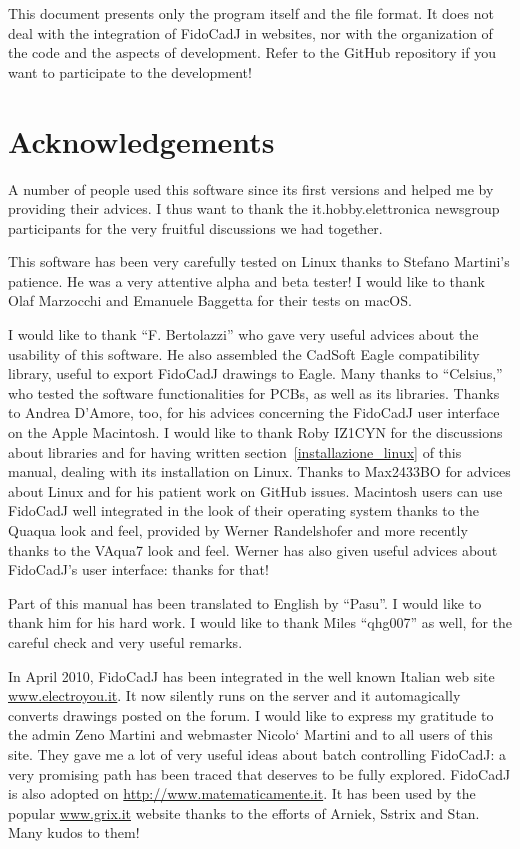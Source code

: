 \documentclass[10pt,a4paper,twoside]{scrreprt}
\begin{document}
This document presents only the program itself and the file format. It does not deal with the integration of FidoCadJ in websites, nor with the organization of the code and the aspects of development. Refer to the GitHub repository if you want to participate to the development!
\endgroup


\chapter*{Acknowledgements}

A number of people used this software since its first versions and
helped me by providing their advices. I thus want to thank the it.hobby.elettronica
newsgroup participants for the very fruitful discussions we had together.

This software has been very carefully tested on Linux thanks to
Stefano Martini's patience. He was a very attentive alpha and beta
tester! I would like to thank Olaf Marzocchi and Emanuele Baggetta
for their tests on macOS.

I would like to thank ``F. Bertolazzi'' who gave very useful
advices about the usability of this software. He also assembled the
CadSoft Eagle compatibility library, useful to export
FidoCadJ drawings to Eagle. Many thanks to ``Celsius,'' who tested
the software functionalities for PCBs, as well as its libraries.
Thanks to Andrea D'Amore, too, for his advices concerning the FidoCadJ user interface on the Apple Macintosh. I would like to thank
Roby IZ1CYN for the discussions about libraries and for having written
section~\ref{installazione_linux} of this manual, dealing with its installation on Linux. Thanks to Max2433BO for advices about Linux and for his patient work on GitHub issues.
Macintosh users can use FidoCadJ well integrated in the look of their operating system thanks to the Quaqua look and feel, provided by Werner Randelshofer and more recently thanks to the VAqua7 look and feel.
Werner has also given useful advices about FidoCadJ's user interface: thanks for that!

Part of this manual has been translated to English by ``Pasu''. I would like to thank him for his hard work. I would like to thank Miles ``qhg007'' as well, for the careful check and very useful remarks.

In April 2010, FidoCadJ has been integrated in the well known Italian web site \href{http://www.electroyou.it}{www.electroyou.it}. It now silently runs on the server and it automagically converts drawings posted on the forum.
I would like to express my gratitude to the admin Zeno Martini and webmaster Nicolo` Martini and to all users of this site. They gave me a lot of very useful ideas about batch controlling FidoCadJ: a very promising path has been traced that deserves to be fully explored. FidoCadJ is also adopted on \href{http://www.matematicamente.it}{http://www.matematicamente.it}. It has been used by the popular \href{http://www.grix.it}{www.grix.it} website thanks to the efforts of Arniek, Sstrix and Stan. Many kudos to them!
\end{document}
